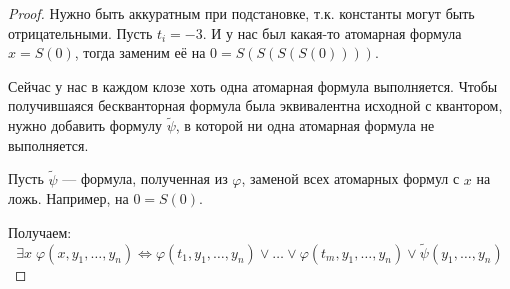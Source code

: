\begin{proof}
    Нужно быть аккуратным при подстановке, т.к. константы могут быть отрицательными. Пусть $t_i = -3$. И у нас был какая-то атомарная формула $x = S(0)$, тогда заменим её на $0 = S(S(S(S(0))))$.

    Сейчас у нас в каждом клозе хоть одна атомарная формула выполняется. Чтобы получившаяся бескванторная формула была эквивалентна исходной с квантором, нужно добавить формулу $\widetilde{\psi}$, в которой ни одна атомарная формула не выполняется. 

    Пусть $\widetilde{\psi}$ --- формула, полученная из $\varphi$, заменой всех атомарных формул с $x$ на ложь. Например, на $0 = S(0)$.

    Получаем:
    $$ \exists x \; \varphi(x, y_1, \dots, y_n) \Longleftrightarrow \varphi(t_1, y_1, \dots, y_n) \vee \dots \vee \varphi(t_m, y_1, \dots, y_n) \vee \widetilde{\psi}(y_1, \dots, y_n) $$
\end{proof}

